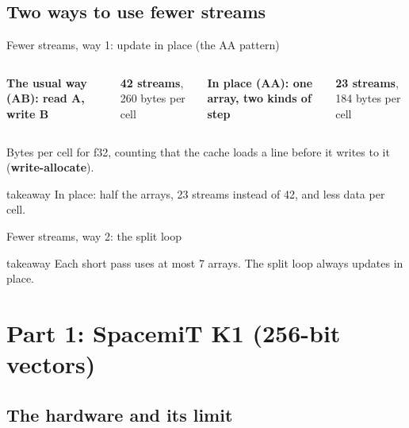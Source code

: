 \documentclass[aspectratio=169,10pt,t]{beamer}
\newcommand{\term}[1]{\textcolor{psblue!85!black}{\textbf{#1}}} %
\newcommand{\takeaway}[1]{\par\vfill
  \begin{beamercolorbox}[wd=\textwidth,sep=4pt,rounded=true]{takeaway}
    \small #1
  \end{beamercolorbox}}
\begin{document}
\subsection{Two ways to use fewer streams}
\begin{frame}{Fewer streams, way 1: update in place (the AA pattern)}
  \vspace{1mm}
  \begin{columns}[T,onlytextwidth]
    {\small\bfseries The usual way (AB): read A, write B\par}
    \vspace{3mm}
    \centering

    \vspace{1mm}
    {\small\textbf{42 streams}, 260 bytes per cell\par}
    {\small\bfseries In place (AA): one array, two kinds of step\par}
    \vspace{1mm}
    \centering

    \vspace{1mm}
    {\small\textbf{23 streams}, 184 bytes per cell\par}
  \end{columns}
  \vfill
  {\scriptsize\color{psgray}Bytes per cell for f32, counting that the cache loads a line before it writes to it
  (\term{write-allocate}).\par}
  \takeaway{In place: half the arrays, 23 streams instead of 42, and less data per cell.}
\end{frame}

\begin{frame}{Fewer streams, way 2: the split loop}
  \vspace{2mm}
  \centering
  \takeaway{Each short pass uses at most 7 arrays. The split loop always updates in place.}
\end{frame}

\section[Part 1: K1]{Part 1: SpacemiT K1 (256-bit vectors)}
\subsection{The hardware and its limit}
\end{document}
